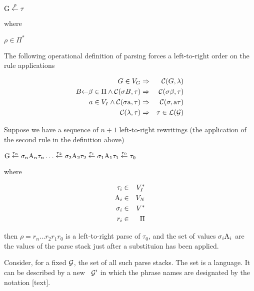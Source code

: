 \begin{center}
${\rm G}\stackrel{\rho}{\leftarrow}\tau$
\end{center}

\noindent where

\begin{center}
$\rho \in \Pi^*$
\end{center}

The following operational definition of parsing forces 
a left-to-right order on the rule applications 

\begin{eqnarray*}
  G \in V_G &\Rightarrow& {\mbox{$\cal C$}}(G, \lambda)                \\
  B\mbox{$\leftarrow$}\beta \in \Pi \wedge {\mbox{$\cal C$}}(\sigma B, \tau) 
      &\Rightarrow& {\mbox{$\cal C$}}(\sigma\beta, \tau)               \\
  a \in V_I \wedge {\mbox{$\cal C$}}(\sigma {\rm a}, \tau)
      &\Rightarrow& {\mbox{$\cal C$}}(\sigma, {\rm a}\tau)             \\
  {\mbox{$\cal C$}}(\lambda, \tau) &\Rightarrow& \tau \in \cal L(G)
\end{eqnarray*}


Suppose we have a sequence of $n+1$ left-to-right rewritings
(the application of the second rule in the definition above)

\begin{center}
${\rm G}\stackrel{r_n}{\leftarrow}\sigma_n{\rm A}_n\tau_n\ldots
\stackrel{r_2}{\leftarrow}\sigma_2{\rm A}_2\tau_2
\stackrel{r_1}{\leftarrow}\sigma_1{\rm A}_1\tau_1
\stackrel{r_0}{\leftarrow}\tau_0$
\end{center}

\noindent where

\begin{eqnarray*}
     \tau_i       &\in& V_I^*           \\
     {\rm A}_i    &\in& V_N             \\
     \sigma_i     &\in& V^*             \\
     r_i	      &\in& \Pi	            \\
\end{eqnarray*}

\noindent then $\rho=r_n\ldots r_2 r_1 r_0$ is 
a left-to-right parse of $\tau_0$,
and the set of values $\sigma_i{\rm A}_i$ are the values of the parse stack
just after a substituion has been applied.

Consider, for a fixed $\cal G$, the set of all such parse stacks.  
The set is a language.  
It can be described by a new \cfg\ $\cal G'$ in which the phrase names
are designated by the notation [text].

